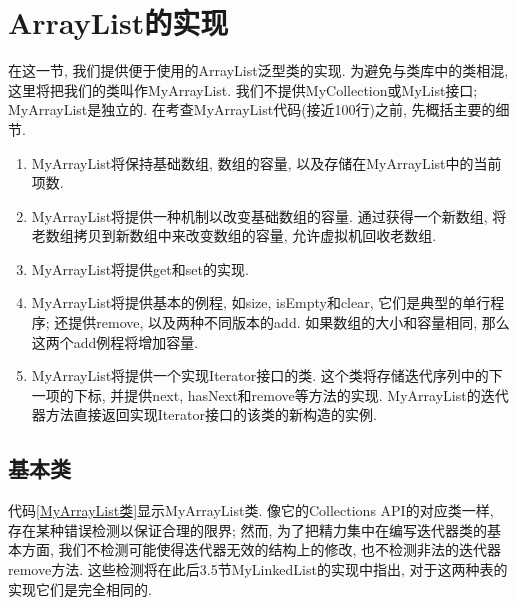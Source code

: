 \documentclass[oneside]{ctexbook}
\begin{document}
\section{ArrayList的实现}

在这一节, 我们提供便于使用的ArrayList泛型类的实现. 为避免与类库中的类相混, 这里将把我们的类叫作MyArrayList. 我们不提供MyCollection或MyList接口; MyArrayList是独立的. 在考查MyArrayList代码(接近100行)之前, 先概括主要的细节.

\begin{enumerate}
    \item MyArrayList将保持基础数组, 数组的容量, 以及存储在MyArrayList中的当前项数.
    \item MyArrayList将提供一种机制以改变基础数组的容量. 通过获得一个新数组, 将老数组拷贝到新数组中来改变数组的容量, 允许虚拟机回收老数组.
    \item MyArrayList将提供get和set的实现.
    \item MyArrayList将提供基本的例程, 如size, isEmpty和clear, 它们是典型的单行程序; 还提供remove, 以及两种不同版本的add. 如果数组的大小和容量相同, 那么这两个add例程将增加容量.
    \item MyArrayList将提供一个实现Iterator接口的类. 这个类将存储迭代序列中的下一项的下标, 并提供next, hasNext和remove等方法的实现. MyArrayList的迭代器方法直接返回实现Iterator接口的该类的新构造的实例.
\end{enumerate}

\subsection{基本类}

代码\ref{MyArrayList类}显示MyArrayList类. 像它的Collections API的对应类一样, 存在某种错误检测以保证合理的限界; 然而, 为了把精力集中在编写迭代器类的基本方面, 我们不检测可能使得迭代器无效的结构上的修改, 也不检测非法的迭代器remove方法. 这些检测将在此后3.5节MyLinkedList的实现中指出, 对于这两种表的实现它们是完全相同的.
\end{document}
